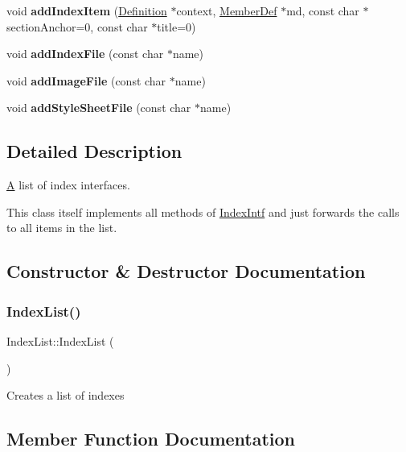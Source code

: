\begin{DoxyCompactItemize}
void {\bfseries add\+Index\+Item} (\mbox{\hyperlink{class_definition}{Definition}} $\ast$context, \mbox{\hyperlink{class_member_def}{Member\+Def}} $\ast$md, const char $\ast$section\+Anchor=0, const char $\ast$title=0)
\item 
\mbox{\label{class_index_list_a847ef82be5132a43cf70e516f6c525aa}} 
void {\bfseries add\+Index\+File} (const char $\ast$name)
\item 
\mbox{\label{class_index_list_aacfe4c4bf0fa41efea7015fc6aa372d6}} 
void {\bfseries add\+Image\+File} (const char $\ast$name)
\item 
\mbox{\label{class_index_list_a86a377209f0483a032c4e3c241a946a9}} 
void {\bfseries add\+Style\+Sheet\+File} (const char $\ast$name)
\end{DoxyCompactItemize}


\subsection{Detailed Description}
\mbox{\hyperlink{class_a}{A}} list of index interfaces. 

This class itself implements all methods of \mbox{\hyperlink{class_index_intf}{Index\+Intf}} and just forwards the calls to all items in the list. 

\subsection{Constructor \& Destructor Documentation}
\mbox{\label{class_index_list_a9d525f0a264b6aba4f8acf2d513a31ea}} 
\subsubsection{\texorpdfstring{IndexList()}{IndexList()}}
{\footnotesize\ttfamily Index\+List\+::\+Index\+List (\begin{DoxyParamCaption}{ }\end{DoxyParamCaption})\hspace{0.3cm}{\ttfamily [inline]}}

Creates a list of indexes 

\subsection{Member Function Documentation}
\mbox{\label{class_index_list_a8120913e328f96fec6e5b2070902f4e7}} 
